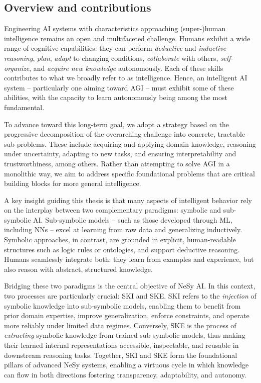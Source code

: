 \begin{refsection}
\section{Overview and contributions}
\label{sec:overview-and-contributions}
%
Engineering \gls{AI} systems with characteristics approaching (super-)human intelligence remains an open and multifaceted challenge.
%
Humans exhibit a wide range of cognitive capabilities: they can perform \emph{deductive} and \emph{inductive reasoning}, \emph{plan}, \emph{adapt} to changing conditions, \emph{collaborate} with others, \emph{self-organize}, and \emph{acquire new knowledge} autonomously.
%
Each of these skills contributes to what we broadly refer to as intelligence.
%
Hence, an intelligent \gls{AI} system -- particularly one aiming toward \gls{AGI} -- must exhibit some of these abilities, with the capacity to learn autonomously being among the most fundamental.


To advance toward this long-term goal, we adopt a strategy based on the progressive decomposition of the overarching challenge into concrete, tractable sub-problems.
%
These include acquiring and applying domain knowledge, reasoning under uncertainty, adapting to new tasks, and ensuring interpretability and trustworthiness, among others.
%
Rather than attempting to solve \gls{AGI} in a monolithic way, we aim to address specific foundational problems that are critical building blocks for more general intelligence.


A key insight guiding this thesis is that many aspects of intelligent behavior rely on the interplay between two complementary paradigms: symbolic and sub-symbolic \gls{AI}.
%
Sub-symbolic models -- such as those developed through \gls{ML}, including \glspl{NN} -- excel at learning from raw data and generalizing inductively.
%
Symbolic approaches, in contrast, are grounded in explicit, human-readable structures such as logic rules or ontologies, and support deductive reasoning.
%
Humans seamlessly integrate both: they learn from examples and experience, but also reason with abstract, structured knowledge.


Bridging these two paradigms is the central objective of \gls{NeSy} \gls{AI}.
%
In this context, two processes are particularly crucial: \gls{SKI} and \gls{SKE}.
%
\Gls{SKI} refers to the \emph{injection} of symbolic knowledge into sub-symbolic models, enabling them to benefit from prior domain expertise, improve generalization, enforce constraints, and operate more reliably under limited data regimes.
%
Conversely, \gls{SKE} is the process of \emph{extracting} symbolic knowledge from trained sub-symbolic models, thus making their learned internal representations accessible, inspectable, and reusable in downstream reasoning tasks.
%
Together, \gls{SKI} and \gls{SKE} form the foundational pillars of advanced \gls{NeSy} systems, enabling a virtuous cycle in which knowledge can flow in both directions fostering transparency, adaptability, and autonomy.



\end{refsection}
